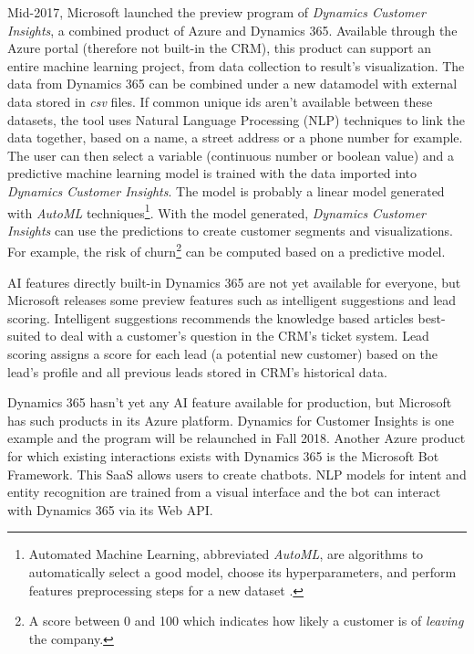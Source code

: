 Mid-2017, Microsoft launched the preview program of \textit{Dynamics Customer Insights}, a combined product of Azure and Dynamics 365. Available through the Azure portal (therefore not built-in the CRM), this product can support an entire machine learning project, from data collection to result's visualization. The data from Dynamics 365 can be combined under a new datamodel with external data stored in \textit{csv} files. If common unique ids aren't available between these datasets, the tool uses Natural Language Processing (NLP) techniques to link the data together, based on a name, a street address or a phone number for example. The user can then select a variable (continuous number or boolean value) and a predictive machine learning model is trained with the data imported into \textit{Dynamics Customer Insights}. The model is probably a linear model generated with \textit{AutoML} techniques\footnote{Automated Machine Learning, abbreviated \textit{AutoML}, are algorithms to automatically select a good model, choose its hyperparameters, and perform features preprocessing steps for a new dataset \cite{NIPS2015_5872}.}. With the model generated, \textit{Dynamics Customer Insights} can use the predictions to create customer segments and visualizations. For example, the risk of churn\footnote{A score between 0 and 100 which indicates how likely a customer is of \textit{leaving} the company.} can be computed based on a predictive model.

AI features directly built-in Dynamics 365 are not yet available for everyone, but Microsoft releases some preview features such as intelligent suggestions and lead scoring. Intelligent suggestions recommends the knowledge based articles best-suited to deal with a customer's question in the CRM's ticket system. Lead scoring assigns a score for each lead (a potential new customer) based on the lead's profile and all previous leads stored in CRM's historical data.

Dynamics 365 hasn't yet any AI feature available for production, but Microsoft has such products in its Azure platform. Dynamics for Customer Insights is one example and the program will be relaunched in Fall 2018. Another Azure product for which existing interactions exists with Dynamics 365 is the Microsoft Bot Framework. This SaaS allows users to create chatbots. NLP models for intent and entity recognition are trained from a visual interface and the bot can interact with Dynamics 365 via its Web API.

